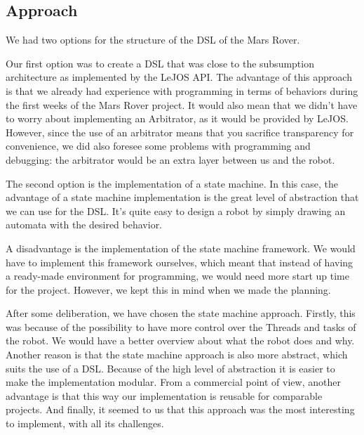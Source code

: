 \documentclass[11pt,a4paper]{article}
\begin{document}
\subsection{Approach}
We had two options for the structure of the DSL of the Mars Rover. 

Our first option was to create a DSL that was close to the subsumption architecture as implemented by the LeJOS API. The advantage of this approach is that we already had experience with programming in terms of behaviors during the first weeks of the Mars Rover project. It would also mean that we didn't have to worry about implementing an Arbitrator, as it would be provided by LeJOS. 
However, since the use of an arbitrator means that you sacrifice transparency for convenience, we did also foresee some problems with programming and debugging: the arbitrator would be an extra layer between us and the robot. 

The second option is the implementation of a state machine.
In this case, the advantage of a state machine implementation is the great level of abstraction that we can use for the DSL. 
It's quite easy to design a robot by simply drawing an automata with the desired behavior.

A disadvantage is the implementation of the state machine framework. 
We would have to implement this framework ourselves, which meant that instead of having a ready-made environment for programming, we would need more start up time for the project. However, we kept this in mind when we made the planning.

After some deliberation, we have chosen the state machine approach.
Firstly, this was because of the possibility to have more control over the Threads and tasks of the robot. 
We would have a better overview about what the robot does and why. 
Another reason is that the state machine approach is also more abstract, which suits the use of a DSL. 
Because of the high level of abstraction it is easier to make the implementation modular. 
From a commercial point of view, another advantage is that this way our implementation is reusable for comparable projects. 
And finally, it seemed to us that this approach was the most interesting to implement, with all its challenges.
\end{document}
